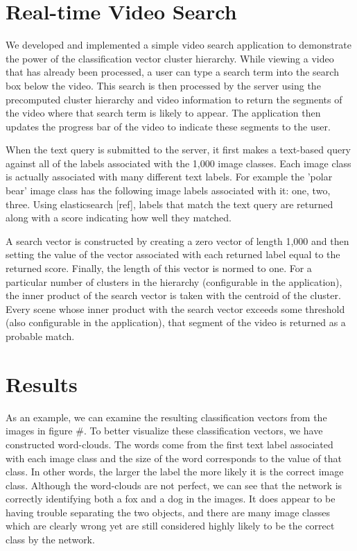\documentclass{article}
\begin{document}
\section{Real-time Video Search}

We developed and implemented a simple video search application to demonstrate the power of the classification vector cluster hierarchy.
While viewing a video that has already been processed, a user can type a search term into the search box below the video.
This search is then processed by the server using the precomputed cluster hierarchy and video information to return the segments of the video where that search term is likely to appear.
The application then updates the progress bar of the video to indicate these segments to the user.

When the text query is submitted to the server, it first makes a text-based query against all of the labels associated with the 1,000 image classes.
Each image class is actually associated with many different text labels.
For example the 'polar bear' image class has the following image labels associated with it: one, two, three.
Using elasticsearch [ref], labels that match the text query are returned along with a score indicating how well they matched.

A search vector is constructed by creating a zero vector of length 1,000 and then setting the value of the vector associated with each returned label equal to the returned score.
Finally, the length of this vector is normed to one.
For a particular number of clusters in the hierarchy (configurable in the application), the inner product of the search vector is taken with the centroid of the cluster.
Every scene whose inner product with the search vector exceeds some threshold (also configurable in the application), that segment of the video is returned as a probable match.

\section{Results}

As an example, we can examine the resulting classification vectors from the images in figure \#. 
To better visualize these classification vectors, we have constructed word-clouds.
The words come from the first text label associated with each image class and the size of the word corresponds to the value of that class. 
In other words, the larger the label the more likely it is the correct image class.
Although the word-clouds are not perfect, we can see that the network is correctly identifying both a fox and a dog in the images.
It does appear to be having trouble separating the two objects, and there are many image classes which are clearly wrong yet are still considered highly likely to be the correct class by the network.
\end{document}
